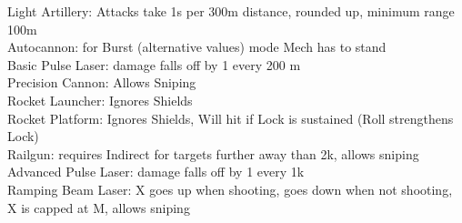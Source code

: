 \documentclass{article}
\begin{document}
    Light Artillery: Attacks take 1s per 300m distance, rounded up, minimum range 100m\\
    Autocannon: for Burst (alternative values) mode Mech has to stand\\
    Basic Pulse Laser: damage falls off by 1 every 200 m \\
    Precision Cannon: Allows Sniping \\
    Rocket Launcher: Ignores Shields \\
    Rocket Platform: Ignores Shields, Will hit if Lock is sustained (Roll strengthens Lock)\\
    Railgun: requires Indirect for targets further away than 2k, allows sniping\\
    Advanced Pulse Laser: damage falls off by 1 every 1k \\
    Ramping Beam Laser: X goes up when shooting, goes down when not shooting, X is capped at M, allows sniping\\
\end{document}
